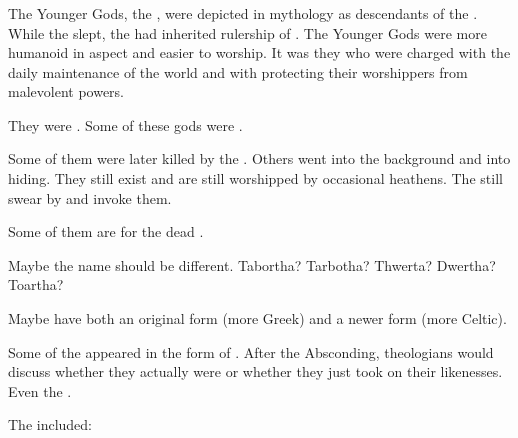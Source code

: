 



\subsubsection{\Taorthae}
The Younger Gods, the \Taorthae, were depicted in mythology as descendants of the \Primordials.
While the \Primordials slept, the \Taorthae had inherited rulership of \Miith.
The Younger Gods were more humanoid in aspect and easier to worship. 
It was they who were charged with the daily maintenance of the world and with protecting their worshippers from malevolent powers.
  
They were . 
Some of these gods were \dragons. 

Some of them were later killed by the . 
Others went into the background and into hiding. 
They still exist and are still worshipped by occasional heathens. 
The \rethyaxes{} still swear by and invoke them. 

Some of them are  for the dead . 

Maybe the name should be different. 
Tabortha? 
Tarbotha? 
Thwerta?
Dwertha? 
Toartha?

Maybe have both an original \Ortaican{} form (more Greek) and a newer \Tepharin{} form (more Celtic). 

Some of the \taorthae appeared in the form of \dragons. 
After the Absconding, \rethyactic theologians would discuss whether they actually were \dragons or whether they just took on their likenesses. 
Even the \rethyaxes {}.

The \taorthae included: 

